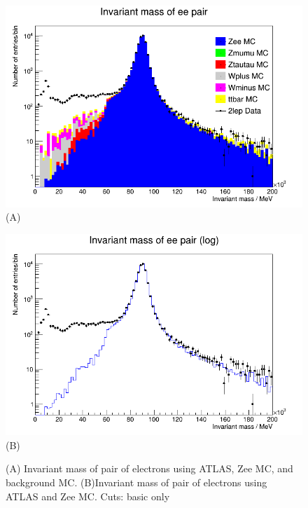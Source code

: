 \begin{figure}[h!]
    \centering
    \begin{minipage}{0.5\textwidth}
        \centering
        \includegraphics[width=\linewidth]{plots/02-03-2021/08-58_basic.png}
        (A)
    \end{minipage}\hfill
    \begin{minipage}{0.5\textwidth}
        \centering
        \includegraphics[width=\linewidth]{plots/02-03-2021/08-59_2Stack.png}
        (B)
    \end{minipage}
    \caption{(A) Invariant mass of pair of electrons using ATLAS, Zee MC, and background MC.  (B)Invariant mass of pair of electrons using ATLAS and Zee MC.  Cuts: basic only}
    \label{fig:08-58_02-03-21}
\end{figure}

